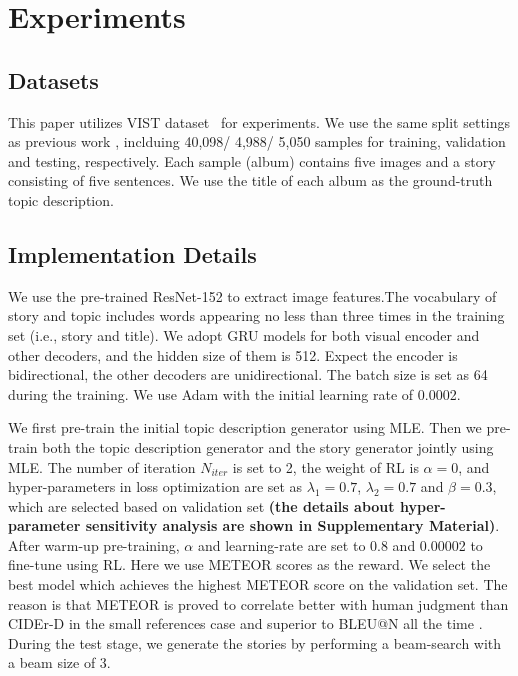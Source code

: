 \documentclass[11pt]{article}
\newcommand{\citep}{\cite}
\begin{document}
\section{Experiments}

\subsection{Datasets}
This paper utilizes VIST dataset~\citep{huang2016visual} for experiments. We use the same split settings as previous work \citep{Wang:2018tda}, inclduing 40,098/ 4,988/ 5,050 samples for training, validation and testing, respectively. Each sample (album) contains five images and a story consisting of five sentences. We use the title of each album as the ground-truth topic description.

\subsection{Implementation Details}
We use the pre-trained ResNet-152 \citep{he2016deep} to extract image features.The vocabulary of story and topic includes words appearing no less than three times in the training set (i.e., story and title). We adopt GRU models for both visual encoder and other decoders, and the hidden size of them is 512. Expect the encoder is bidirectional, the other decoders are unidirectional. The batch size is set as 64 during the training. We use Adam \citep{kingma2015adam} with the initial learning rate of 0.0002.


We first pre-train the initial topic description generator using MLE. Then we pre-train both the topic description generator and the story generator jointly using MLE. The number of iteration $N_{iter}$ is set to 2, the weight of RL is $\alpha=0$, and hyper-parameters in loss optimization are set as $\lambda_1=0.7$, $\lambda_2=0.7$ and $\beta=0.3$, which are selected based on validation set \textbf{(the details about hyper-parameter sensitivity analysis are shown in Supplementary Material)}. After warm-up pre-training, $\alpha$ and learning-rate are set to 0.8 and 0.00002 to fine-tune using RL. Here we use METEOR scores as the reward. We select the best model which achieves the highest METEOR score on the validation set. The reason is that METEOR is proved to correlate better with human judgment than CIDEr-D in the small references case and superior to BLEU@N all the time \citep{vedantam2015cider,wang2018show}. During the test stage, we generate the stories by performing a beam-search with a beam size of 3.
\end{document}

